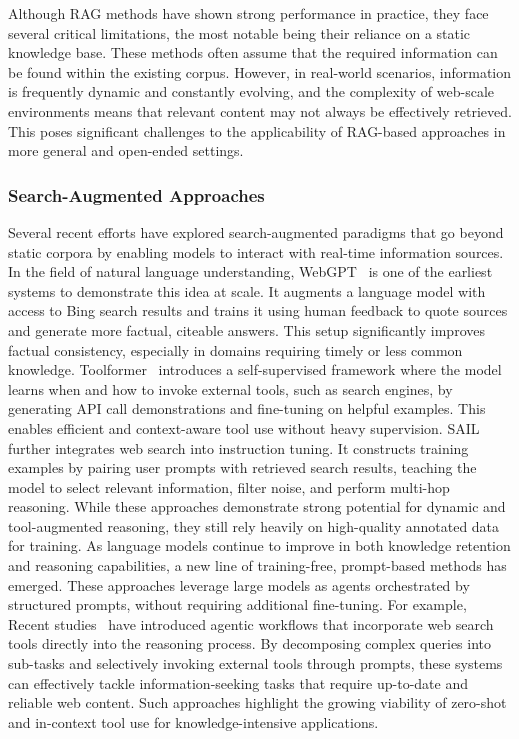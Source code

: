 \documentclass{article}
\begin{document}
Although RAG methods have shown strong performance in practice, they face several critical limitations, the most notable being their reliance on a static knowledge base. These methods often assume that the required information can be found within the existing corpus. However, in real-world scenarios, information is frequently dynamic and constantly evolving, and the complexity of web-scale environments means that relevant content may not always be effectively retrieved. This poses significant challenges to the applicability of RAG-based approaches in more general and open-ended settings.

\subsubsection{Search-Augmented Approaches}

Several recent efforts have explored search-augmented paradigms that go beyond static corpora by enabling models to interact with real-time information sources. In the field of natural language understanding, WebGPT~\cite{text-search/webgpt} is one of the earliest systems to demonstrate this idea at scale. It augments a language model with access to Bing search results and trains it using human feedback to quote sources and generate more factual, citeable answers. This setup significantly improves factual consistency, especially in domains requiring timely or less common knowledge. Toolformer~\cite{text-search/toolformer} introduces a self-supervised framework where the model learns when and how to invoke external tools, such as search engines, by generating API call demonstrations and fine-tuning on helpful examples. This enables efficient and context-aware tool use without heavy supervision. SAIL~\cite{text-search/sail} further integrates web search into instruction tuning. It constructs training examples by pairing user prompts with retrieved search results, teaching the model to select relevant information, filter noise, and perform multi-hop reasoning. While these approaches demonstrate strong potential for dynamic and tool-augmented reasoning, they still rely heavily on high-quality annotated data for training. As language models continue to improve in both knowledge retention and reasoning capabilities, a new line of training-free, prompt-based methods has emerged. These approaches leverage large models as agents orchestrated by structured prompts, without requiring additional fine-tuning. For example, Recent studies~\cite{text-search/deepresearcher,text-search/open-deep-search} have introduced agentic workflows that incorporate web search tools directly into the reasoning process. By decomposing complex queries into sub-tasks and selectively invoking external tools through prompts, these systems can effectively tackle information-seeking tasks that require up-to-date and reliable web content. Such approaches highlight the growing viability of zero-shot and in-context tool use for knowledge-intensive applications. 
\end{document}
